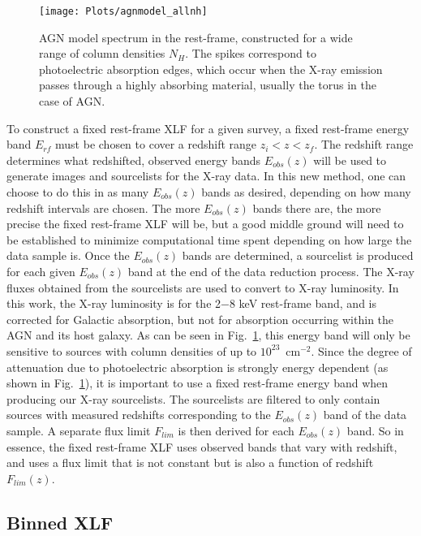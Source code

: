 \documentclass[fleqn,usenatbib]{mnras}
\begin{document}
	\begin{figure}
		\centering
  		\texttt{[image: Plots/agnmodel\_allnh]}
  		\caption{AGN model spectrum in the rest-frame, constructed for a wide range of column densities $N_{H}$. The spikes correspond to photoelectric absorption edges, which occur when the X-ray emission passes through a highly absorbing material, usually the torus in the case of AGN.}
  		\label{fig:agnmodel_allnh}
	\end{figure}

To construct a fixed rest-frame XLF for a given survey, a fixed rest-frame energy band $E_{rf}$ must be chosen to cover a redshift range $z_{i} < z < z_{f}$. 
The redshift range determines what redshifted, observed energy bands $E_{obs}(z)$ will be used to generate images and sourcelists for the X-ray data.
In this new method, one can choose to do this in as many $E_{obs}(z)$ bands as desired, depending on how many redshift intervals are chosen. 
The more $E_{obs}(z)$ bands there are, the more precise the fixed rest-frame XLF will be, but a good middle ground will need to be established to minimize computational time spent depending on how large the data sample is.
Once the $E_{obs}(z)$ bands are determined, a sourcelist is produced for each given $E_{obs}(z)$ band at the end of the data reduction process. 
The X-ray fluxes obtained from the sourcelists are used to convert to X-ray luminosity.
In this work, the X-ray luminosity is for the 2$-$8 keV rest-frame band, and is corrected for Galactic absorption, but not for absorption occurring within the AGN and its host galaxy. 
As can be seen in Fig.~\ref{fig:agnmodel_allnh}, this energy band will only be sensitive to sources with column densities of up to $10^{23}$~cm$^{-2}$.
Since the degree of attenuation due to photoelectric absorption is strongly energy dependent (as shown in Fig.~\ref{fig:agnmodel_allnh}), it is important to use a fixed rest-frame energy band when producing our X-ray sourcelists.
The sourcelists are filtered to only contain sources with measured redshifts corresponding to the $E_{obs}(z)$ band of the data sample.
A separate flux limit $F_{lim}$ is then derived for each $E_{obs}(z)$ band. 
So in essence, the fixed rest-frame XLF uses observed bands that vary with redshift, and uses a flux limit that is not constant but is also a function of redshift $F_{lim}(z)$. 


	
	\subsection{Binned XLF}\label{subsec:zmethodbinned}
	
\end{document}
